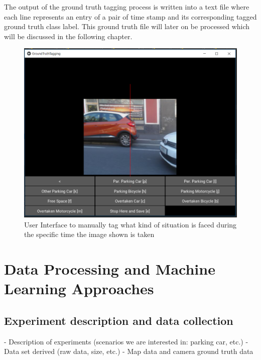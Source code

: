 The output of the ground truth tagging process is written into a text file where each line represents an entry of a pair of time stamp and its corresponding tagged ground truth class label. This ground truth file will later on be processed which will be discussed in the following chapter.





\begin{figure}
	\centering
	\includegraphics[width=\textwidth]{img/ground_truth_tagging_ui.PNG}
	\caption{User Interface to manually tag what kind of situation is faced during the specific time the image shown is taken}
	\label{fig:ground_truth_tagging_ui}
\end{figure}








\chapter{Data Processing and Machine Learning Approaches}

\section{Experiment description and data collection}
\label{sec:experiment_description_data_collection}
- Description of experiments (scenarios we are interested in: parking car, etc.)
- Data set derived (raw data, size, etc.)
- Map data and camera ground truth data

